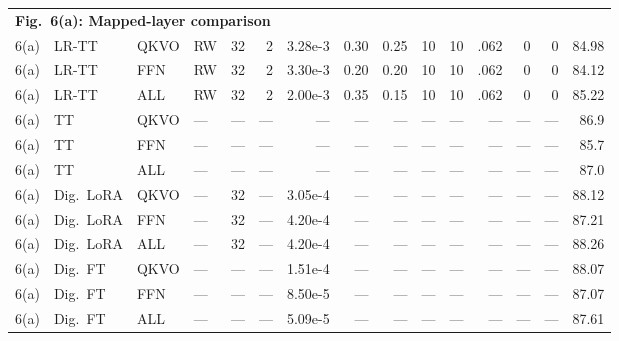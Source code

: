 \documentclass[AMA,LATO1COL]{WileyNJDv5}
\begin{document}
{\begin{longtable}{@{}l l l l r r r r r r r r r r r@{}}
\multicolumn{15}{l}{\cellcolor{HeadGray}\textbf{Fig.~6(a): Mapped-layer comparison}} \\
6(a) & LR-TT & QKVO & RW & 32 & 2 & 3.28e-3 & 0.30 & 0.25 & 10 & 10 & .062 & 0 & 0 & 84.98 \\
6(a) & LR-TT & FFN & RW & 32 & 2 & 3.30e-3 & 0.20 & 0.20 & 10 & 10 & .062 & 0 & 0 & 84.12 \\
6(a) & LR-TT & ALL & RW & 32 & 2 & 2.00e-3 & 0.35 & 0.15 & 10 & 10 & .062 & 0 & 0 & 85.22 \\
6(a) & TT & QKVO & --- & --- & --- & --- & --- & --- & --- & --- & --- & --- & --- & 86.9 \\
6(a) & TT & FFN & --- & --- & --- & --- & --- & --- & --- & --- & --- & --- & --- & 85.7 \\
6(a) & TT & ALL & --- & --- & --- & --- & --- & --- & --- & --- & --- & --- & --- & 87.0 \\
6(a) & Dig.\ LoRA & QKVO & --- & 32 & --- & 3.05e-4 & --- & --- & --- & --- & --- & --- & --- & 88.12 \\
6(a) & Dig.\ LoRA & FFN & --- & 32 & --- & 4.20e-4 & --- & --- & --- & --- & --- & --- & --- & 87.21 \\
6(a) & Dig.\ LoRA & ALL & --- & 32 & --- & 4.20e-4 & --- & --- & --- & --- & --- & --- & --- & 88.26 \\
6(a) & Dig.\ FT & QKVO & --- & --- & --- & 1.51e-4 & --- & --- & --- & --- & --- & --- & --- & 88.07 \\
6(a) & Dig.\ FT & FFN & --- & --- & --- & 8.50e-5 & --- & --- & --- & --- & --- & --- & --- & 87.07 \\
6(a) & Dig.\ FT & ALL & --- & --- & --- & 5.09e-5 & --- & --- & --- & --- & --- & --- & --- & 87.61 \\
\midrule


\end{longtable}}
\end{document}
